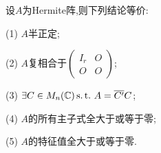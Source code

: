 \begin{theorem}
  设$A$为Hermite阵,则下列结论等价:

  (1) $A$半正定;

  (2) $A$复相合于$
  \begin{pmatrix}
    I_r&O\\
    O&O
  \end{pmatrix}
  $;

  (3) $\exists C \in M_n(\mathbb{C}) \operatorname{{}s.t.{}} A=\overline{C'}C$;

  (4) $A$的所有主子式全大于或等于零;

  (5) $A$的特征值全大于或等于零.
\end{theorem}
